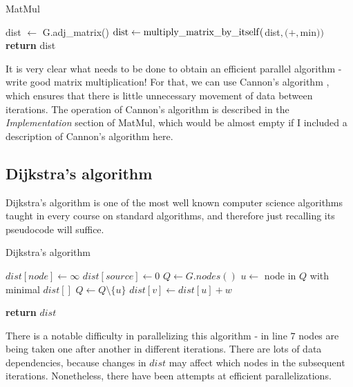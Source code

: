 \documentclass[12pt,a4paper,twoside,openright]{report}
\begin{document}
\begin{algorithm}
\caption{MatMul}\label{matmul}
\begin{algorithmic}[1]
\State dist $\gets$ G.adj\_matrix()
        \State $\rm{dist} \gets {\rm multiply\_matrix\_by\_itself}($dist$,(+,$min$))$
      \EndFor
\State \textbf{return} dist
\EndProcedure
\end{algorithmic}
\end{algorithm}

It is very clear what needs to be done to obtain an efficient parallel algorithm - write good matrix multiplication! For that, we can use Cannon's algorithm \cite{cannon}, which ensures that there is little unnecessary movement of data between iterations. The operation of Cannon's algorithm is described in the \textit{Implementation} section of MatMul, which would be almost empty if I included a description of Cannon's algorithm here. 

\subsection{Dijkstra's algorithm}
Dijkstra's algorithm is one of the most well known computer science algorithms taught in every course on standard algorithms, and therefore just recalling its pseudocode will suffice.

\begin{algorithm}
\caption{Dijkstra's algorithm}\label{dijkstra}
\begin{algorithmic}[1]
    \State $dist[node] \gets \infty$
\EndFor
\State $dist[source] \gets 0$
\State $Q \gets G.nodes()$
        \State $u \gets$ node in $Q$ with minimal $dist[]$
        \State $Q \gets Q \setminus \{u\}$
            \State $dist[v] \gets dist[u] + w$
        \EndIf
      \EndFor
    \EndWhile
    
    
\State \textbf{return} $dist$
\EndProcedure
\end{algorithmic}
\end{algorithm}

There is a notable difficulty in parallelizing this algorithm - in line $7$ nodes are being taken one after another in different iterations. There are lots of data dependencies, because changes in $dist$ may affect which nodes in the subsequent iterations. Nonetheless, there have been attempts at efficient parallelizations.
\end{document}

